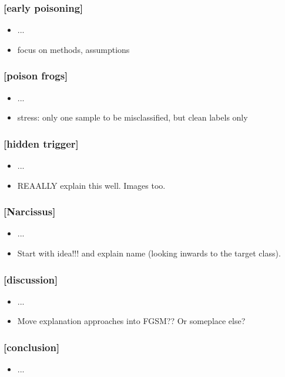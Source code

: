 \documentclass[t,english]{beamer}
\begin{document}
\begin{frame}
  \frametitle{[early poisoning]}
  
  \begin{itemize}
      \item []...
      \item focus on methods, assumptions
  \end{itemize}
\end{frame}

\begin{frame}
  \frametitle{[poison frogs]}
  
  \begin{itemize}
      \item []...
      \item stress: only one sample to be misclassified, but clean labels only
  \end{itemize}
\end{frame}

\begin{frame}
  \frametitle{[hidden trigger]}
  
  \begin{itemize}
      \item []...
      \item REAALLY explain this well. Images too.
  \end{itemize}
\end{frame}

\begin{frame}
  \frametitle{[Narcissus]}
  
  \begin{itemize}
      \item []...
      \item Start with idea!!! and explain name (looking inwards to the target class).
  \end{itemize}
\end{frame}


\begin{frame}
  \frametitle{[discussion]}
  
  \begin{itemize}
      \item []...
      \item Move explanation approaches into FGSM?? Or someplace else?
  \end{itemize}
\end{frame}

\begin{frame}
  \frametitle{[conclusion]}
  
  \begin{itemize}
      \item []...
  \end{itemize}
\end{frame}
\end{document}
